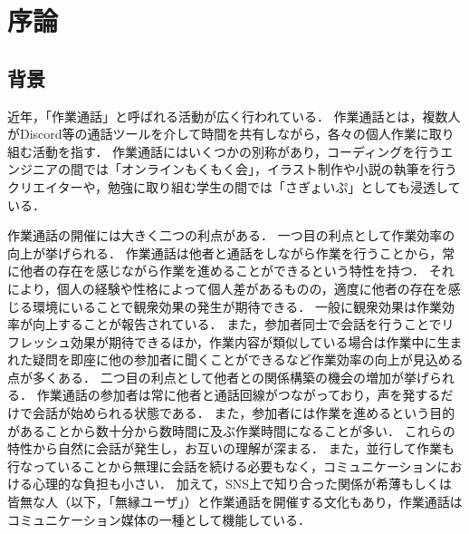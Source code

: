 \chapter{序論\label{sec:introduction}}
\thispagestyle{plain}

\section{背景}

近年，「作業通話」と呼ばれる活動が広く行われている．
作業通話とは，複数人がDiscord\cite{Discord}等の通話ツールを介して時間を共有しながら，各々の個人作業に取り組む活動を指す．
作業通話にはいくつかの別称があり，コーディングを行うエンジニアの間では「オンラインもくもく会」，イラスト制作や小説の執筆を行うクリエイターや，勉強に取り組む学生の間では「さぎょいぷ」としても浸透している．

作業通話の開催には大きく二つの利点がある．
一つ目の利点として作業効率の向上が挙げられる．
作業通話は他者と通話をしながら作業を行うことから，常に他者の存在を感じながら作業を進めることができるという特性を持つ．
それにより，個人の経験や性格によって個人差があるものの，適度に他者の存在を感じる環境にいることで観衆効果の発生が期待できる．
一般に観衆効果は作業効率が向上することが報告されている\cite{Zajonc}\cite{Matsumoto}\cite{Miyamoto}．
また，参加者同士で会話を行うことでリフレッシュ効果が期待できるほか，作業内容が類似している場合は作業中に生まれた疑問を即座に他の参加者に聞くことができるなど作業効率の向上が見込める点が多くある．
二つ目の利点として他者との関係構築の機会の増加が挙げられる．
作業通話の参加者は常に他者と通話回線がつながっており，声を発するだけで会話が始められる状態である．
また，参加者には作業を進めるという目的があることから数十分から数時間に及ぶ作業時間になることが多い．
これらの特性から自然に会話が発生し，お互いの理解が深まる．
また，並行して作業も行なっていることから無理に会話を続ける必要もなく，コミュニケーションにおける心理的な負担も小さい．
加えて，SNS上で知り合った関係が希薄もしくは皆無な人（以下，「無縁ユーザ」）と作業通話を開催する文化もあり，作業通話はコミュニケーション媒体の一種として機能している．

